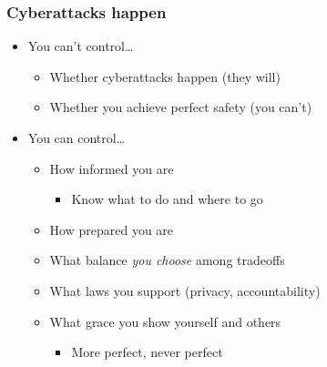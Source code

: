 \documentclass[blue]{beamer}
\begin{document}
\begin{frame}
\frametitle{Cyberattacks happen}

\begin{itemize}
  \item You can't control\ldots{}
  \begin{itemize}
    \item Whether cyberattacks happen (they will)
    \item Whether you achieve perfect safety (you can't)
  \end{itemize}
  \item You can control\ldots{}
  \begin{itemize}
    \item How informed you are
    \begin{itemize}
      \item Know what to do and where to go
    \end{itemize}
    \item How prepared you are
    \item What balance \emph{you choose} among tradeoffs
    \item What laws you support (privacy, accountability)
    \item What grace you show yourself and others
    \begin{itemize}
      \item More perfect, never perfect
    \end{itemize}
  \end{itemize}
\end{itemize}

\end{frame}
\end{document}
